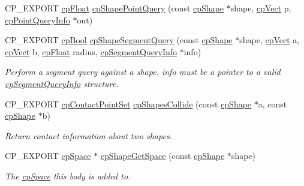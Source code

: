 \begin{DoxyCompactItemize}
C\+P\+\_\+\+E\+X\+P\+O\+RT \mbox{\hyperlink{group__basic_types_gac1ed65573e035bf892505768c852d8d3}{cp\+Float}} \mbox{\hyperlink{group__cp_shape_ga5b0f787bc6f0d614d4616c08c807cd6c}{cp\+Shape\+Point\+Query}} (const \mbox{\hyperlink{structcp_shape}{cp\+Shape}} $\ast$shape, \mbox{\hyperlink{structcp_vect}{cp\+Vect}} p, \mbox{\hyperlink{structcp_point_query_info}{cp\+Point\+Query\+Info}} $\ast$out)
\item 
\mbox{\label{group__cp_shape_gaf25b8d53a1b0185824b1cfdd428c04b7}} 
C\+P\+\_\+\+E\+X\+P\+O\+RT \mbox{\hyperlink{group__basic_types_gabc5e752c48f3449ca26ef413ecbd647e}{cp\+Bool}} \mbox{\hyperlink{group__cp_shape_gaf25b8d53a1b0185824b1cfdd428c04b7}{cp\+Shape\+Segment\+Query}} (const \mbox{\hyperlink{structcp_shape}{cp\+Shape}} $\ast$shape, \mbox{\hyperlink{structcp_vect}{cp\+Vect}} a, \mbox{\hyperlink{structcp_vect}{cp\+Vect}} b, \mbox{\hyperlink{group__basic_types_gac1ed65573e035bf892505768c852d8d3}{cp\+Float}} radius, \mbox{\hyperlink{structcp_segment_query_info}{cp\+Segment\+Query\+Info}} $\ast$info)
\begin{DoxyCompactList}\small\item\em Perform a segment query against a shape. {\ttfamily info} must be a pointer to a valid \mbox{\hyperlink{structcp_segment_query_info}{cp\+Segment\+Query\+Info}} structure. \end{DoxyCompactList}\item 
\mbox{\label{group__cp_shape_ga0afd273a80a6cbdf01cc93ca7a9975db}} 
C\+P\+\_\+\+E\+X\+P\+O\+RT \mbox{\hyperlink{structcp_contact_point_set}{cp\+Contact\+Point\+Set}} \mbox{\hyperlink{group__cp_shape_ga0afd273a80a6cbdf01cc93ca7a9975db}{cp\+Shapes\+Collide}} (const \mbox{\hyperlink{structcp_shape}{cp\+Shape}} $\ast$a, const \mbox{\hyperlink{structcp_shape}{cp\+Shape}} $\ast$b)
\begin{DoxyCompactList}\small\item\em Return contact information about two shapes. \end{DoxyCompactList}\item 
\mbox{\label{group__cp_shape_ga799e281e0a6cc1ba455ff137c572636e}} 
C\+P\+\_\+\+E\+X\+P\+O\+RT \mbox{\hyperlink{structcp_space}{cp\+Space}} $\ast$ \mbox{\hyperlink{group__cp_shape_ga799e281e0a6cc1ba455ff137c572636e}{cp\+Shape\+Get\+Space}} (const \mbox{\hyperlink{structcp_shape}{cp\+Shape}} $\ast$shape)
\begin{DoxyCompactList}\small\item\em The \mbox{\hyperlink{structcp_space}{cp\+Space}} this body is added to. \end{DoxyCompactList}\item 

\end{DoxyCompactItemize}
